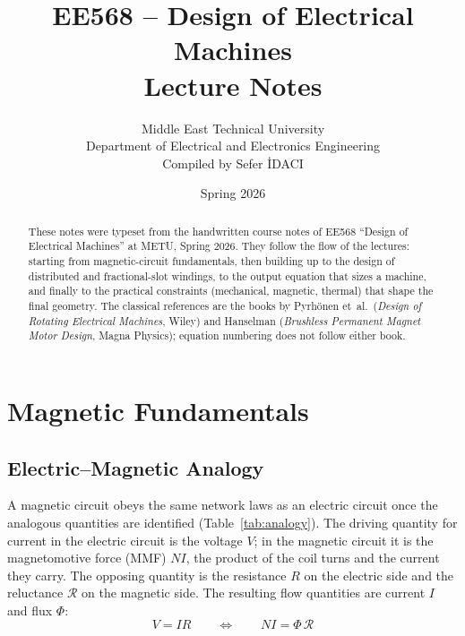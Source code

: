 \documentclass[12pt,a4paper]{article}
\title{\textbf{EE568 -- Design of Electrical Machines}\\[4pt]
       \large Lecture Notes}
\author{Middle East Technical University \\
        Department of Electrical and Electronics Engineering \\[4pt]
        Compiled by Sefer \.{I}DACI}
\date{Spring 2026}
\begin{document}
\maketitle
\thispagestyle{empty}

\begin{abstract}
\noindent
These notes were typeset from the handwritten course notes of EE568
``Design of Electrical Machines'' at METU, Spring 2026. They follow the
flow of the lectures: starting from magnetic-circuit fundamentals, then
building up to the design of distributed and fractional-slot windings,
to the output equation that sizes a machine, and finally to the
practical constraints (mechanical, magnetic, thermal) that shape the
final geometry. The classical references are the books by
Pyrh\"onen et~al.\ (\textit{Design of Rotating Electrical Machines},
Wiley) and Hanselman (\textit{Brushless Permanent Magnet Motor Design},
Magna Physics); equation numbering does not follow either book.
\end{abstract}

\tableofcontents
\newpage

\section{Magnetic Fundamentals}
\label{sec:magnetics}

\subsection{Electric--Magnetic Analogy}

A magnetic circuit obeys the same network laws as an electric circuit
once the analogous quantities are identified
(Table~\ref{tab:analogy}).
The driving quantity for current in the electric circuit is the voltage
$V$; in the magnetic circuit it is the magnetomotive force (MMF)
$NI$, the product of the coil turns and the current they carry.
The opposing quantity is the resistance $R$ on the electric side and
the reluctance $\mathcal{R}$ on the magnetic side.
The resulting flow quantities are current $I$ and flux $\Phi$:
\begin{equation}
  V = IR
  \qquad\Longleftrightarrow\qquad
  NI = \Phi\,\mathcal{R}
\end{equation}
\end{document}
